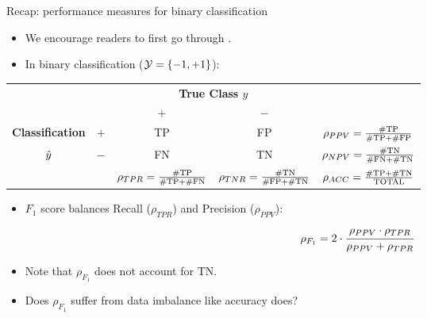 \documentclass[11pt,compress,t,notes=noshow, xcolor=table]{beamer}
\begin{document}
\begin{frame}{Recap: performance measures for binary classification}
    \footnotesize{
        \begin{itemize}
            \item We encourage readers to first go through .
            \item In binary classification  ($\mathcal{Y} = \{-1,+1\}$):

		\end{itemize}
		
		\begin{center}
		\tiny
		\renewcommand{\arraystretch}{1.1}
		\begin{tabular}{cc||cc|c}
			& & \multicolumn{2}{c|}{\bfseries True Class $y$} & \\
			& & $+$ & $-$ & \\ 
			\hline \hline
			\bfseries Classification     & $+$ & TP & FP & $\rho_{PPV} = \frac{\# \text{TP}}{\# \text{TP} + \# \text{FP}}$\\
			$\hat{y}$ & $-$ & FN & TN & $\rho_{NPV} = \frac{\# \text{TN}}{\# \text{FN} + \# \text{TN}}$\\
			\hline
			& & $\rho_{TPR} = \frac{\# \text{TP}}{\# \text{TP} + \# \text{FN}}$ & $\rho_{TNR} = \frac{\# \text{TN}}{\# \text{FP} + \# \text{TN}}$ & $\rho_{ACC} = \frac{\# \text{TP}+ \# \text{TN}}{\text{TOTAL}}$
		\end{tabular}
		\renewcommand{\arraystretch}{1}
        \end{center}

        \begin{itemize}
            \item $F_1$ score balances Recall ($\rho_{TPR}$) and Precision ($\rho_{PPV}$):
            $$\rho_{F_1} = 2 \cdot \cfrac{\rho_{PPV} \cdot \rho_{TPR}}{\rho_{PPV} + \rho_{TPR}}$$
            
            \item Note that $\rho_{F_1}$ does not account for TN.
            
            \item Does $\rho_{F_1}$ suffer from data imbalance like accuracy does?
        \end{itemize}
            
    }
    
\end{frame}
\end{document}
